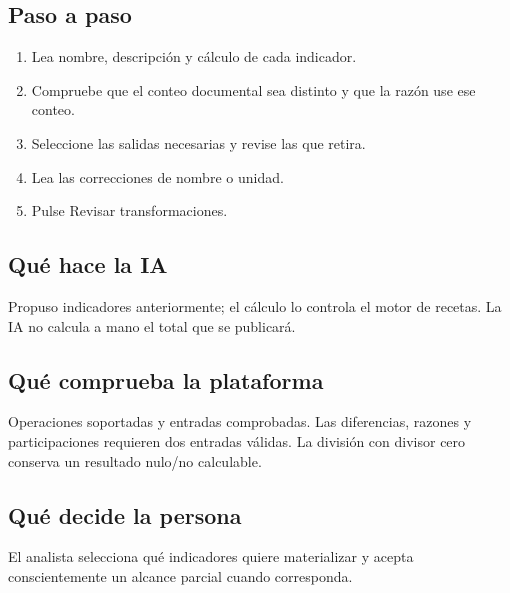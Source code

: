 \subsection{Paso a paso}
\begin{enumerate}
\item Lea nombre, descripción y cálculo de cada indicador.\par\nopagebreak[4]
\item Compruebe que el conteo documental sea distinto y que la razón use ese conteo.\par\nopagebreak[4]
\item Seleccione las salidas necesarias y revise las que retira.\par\nopagebreak[4]
\item Lea las correcciones de nombre o unidad.\par\nopagebreak[4]
\item Pulse Revisar transformaciones.\par\nopagebreak[4]
\end{enumerate}
\subsection{Qué hace la IA}
Propuso indicadores anteriormente; el cálculo lo controla el motor de recetas. La IA no calcula a mano el total que se publicará.

\subsection{Qué comprueba la plataforma}
Operaciones soportadas y entradas comprobadas. Las diferencias, razones y participaciones requieren dos entradas válidas. La división con divisor cero conserva un resultado nulo/no calculable.

\subsection{Qué decide la persona}
El analista selecciona qué indicadores quiere materializar y acepta conscientemente un alcance parcial cuando corresponda.

